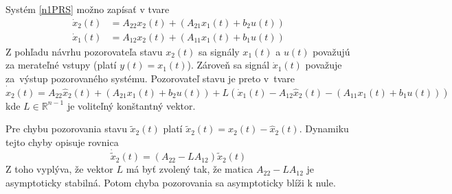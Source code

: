 \documentclass[a4paper, 10pt, ]{article}
\begin{document}
Systém \eqref{n1PRS} možno zapísať v tvare
\begin{subequations}
    \begin{align}
    	\dot{x}_2(t) & = A_{22} x_2(t) + \left( A_{21} x_1(t) + b_2 u(t) \right) \\
    	\dot{x}_1(t) & = A_{12} x_2(t) + \left( A_{11} x_1(t) + b_1 u(t) \right)
    \end{align}
\end{subequations}
Z pohľadu návrhu pozorovateľa stavu $x_2(t)$ sa signály $x_1(t)$ a $u(t)$ považujú za merateľné vstupy (platí $y(t) = x_1(t)$). Zároveň sa signál $\dot{x}_1(t)$ považuje za~výstup pozorovaného systému. Pozorovateľ stavu je preto v~tvare
\begin{equation}
	\dot{\hat{x}}_2(t) = A_{22} \hat{x}_2(t) + \left( A_{21} x_1(t) + b_2 u(t) \right) + L \left( \dot{x}_1(t) - A_{12} \hat{x}_2(t) - \left( A_{11} x_1(t) + b_1 u(t) \right) \right)
\end{equation}
kde $L \in \mathbb{R}^{n-1}$ je voliteľný konštantný vektor.











Pre chybu pozorovania stavu $\tilde{x}_2(t)$ platí $\tilde{x}_2(t) = x_2(t) - \hat{x}_2(t)$. Dynamiku tejto chyby opisuje rovnica
\begin{equation}
	\dot{\tilde{x}}_2(t) = \left( A_{22} - L A_{12} \right) \tilde{x}_2(t)
\end{equation}
Z toho vyplýva, že vektor $L$ má byť zvolený tak, že matica $ A_{22} - L A_{12} $ je asymptoticky stabilná. Potom chyba pozorovania sa asymptoticky blíži k nule.
\end{document}
